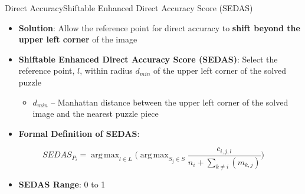 \documentclass[10pt]{beamer}
\DeclareMathOperator*{\argmax}{arg\,max} %
\begin{document}
\begin{frame}{Direct Accuracy}{Shiftable Enhanced Direct Accuracy Score (SEDAS)}
  \begin{itemize}
    \item \textbf{Solution}: Allow the reference point for direct accuracy to {\color{spartanBlue}\textbf{shift beyond the upper left corner}} of the image
    \vfill
    \item \textbf{Shiftable Enhanced Direct Accuracy Score (SEDAS)}: Select the reference point, $l$, within radius $d_{min}$ of the upper left corner of the solved puzzle
    \begin{itemize}
      \vspace{0.6em}
      \item $d_{min}$ -- Manhattan distance between the upper left corner of the solved image and the nearest puzzle piece
    \end{itemize}
    \vfill
    \item \textbf{Formal Definition of SEDAS}:
  \end{itemize}
  \vfill  
  \begin{equation} \label{eq:shiftableEnhancedDirectAccuracyScore}
    SEDAS_{P_i} = \argmax_{l \in L} \bigg( \argmax_{S_j \in S}\frac{c_{i,j,l}}{n_i + \sum_{k \ne i}(m_{k,j})} \bigg)
  \end{equation}
  \vspace{-1em}
  \vfill
  \begin{itemize}
    \item \textbf{SEDAS Range}: 0 to 1
  \end{itemize}
\end{frame}
\end{document}
